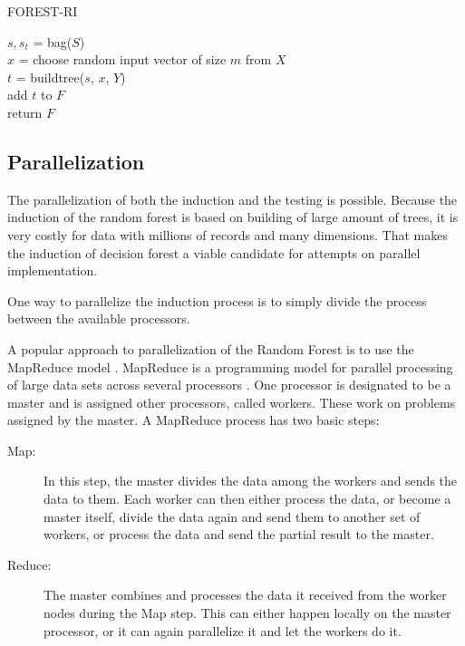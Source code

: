 \documentclass[thesis=B,english]{FITthesis}[2012/10/20]
\begin{document}
	\begin{algorithm}[H]
		\caption{FOREST-RI}
		\label{alg:forestri}
		\Begin
		{
		 {
			$s,s_t$ = bag($S$)\\
			$x$ = choose random input vector of size $m$ from $X$\\
			$t$ = buildtree($s$, $x$, $Y$)\\
			add $t$ to $F$\\

		}
		return $F$
		}

	\end{algorithm}

	\subsection{Parallelization}
	The parallelization of both the induction and the testing is possible. Because the induction of the random forest is based on building of large amount of trees, it is very costly for data with millions of records and many dimensions. That makes the induction of decision forest a viable candidate for attempts on parallel implementation.

	One way to parallelize the induction process is to simply divide the process between the available processors.

	A popular approach to parallelization of the Random Forest is to use the MapReduce model \cite{SCALABLE_RDF,han2013scalable}. MapReduce is a programming model for parallel processing of large data sets across several processors  \cite{dean2008mapreduce}. One processor is designated to be a master and is assigned other processors, called workers. These work on problems assigned by the master. A MapReduce process has two basic steps:
	\begin{description}
	\item [Map:] In this step, the master divides the data among the workers and sends the data to them. Each worker can then either process the data, or become a master itself, divide the data again and send them to another set of workers, or process the data and send the partial result to the master.
	\item [Reduce:] The master combines and processes the data it received from the worker nodes during the Map step. This can either happen locally on the master processor, or it can again parallelize it and let the workers do it.
	\end{description}
\end{document}
